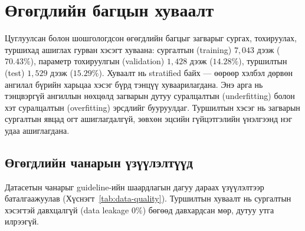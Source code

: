 \section{Өгөгдлийн багцын хуваалт}

Цуглуулсан болон шошгологдсон өгөгдлийн багцыг загварыг сургах, тохируулах, туршихад
ашиглах гурван хэсэгт хуваана: сургалтын (training) $7{,}043$ дээж ($70.43\%$),
параметр тохируулгын (validation) $1{,}428$ дээж ($14.28\%$), туршилтын (test)
$1{,}529$ дээж ($15.29\%$). Хуваалт нь stratified байх ---
өөрөөр хэлбэл дөрвөн ангилал бүрийн харьцаа хэсэг бүрд тэнцүү хуваарилагдана.
Энэ арга нь тэнцвэргүй ангиллын нөхцөлд загварын дутуу суралцалтын
(underfitting) болон хэт суралцалтын (overfitting) эрсдлийг бууруулдаг.
Туршилтын хэсэг нь загварын сургалтын явцад огт ашиглагдалгүй, зөвхөн эцсийн
гүйцэтгэлийн үнэлгээнд нэг удаа ашиглагдана.

\begin{table}[H]
\centering
\caption{Өгөгдлийн багцын ангилал бүрийн жишээний тоо (10,000 дээж)}
\label{tab:data-stats}
\end{table}

\subsection{Өгөгдлийн чанарын үзүүлэлтүүд}

Датасетын чанарыг guideline-ийн шаардлагын дагуу дараах үзүүлэлтээр
баталгаажуулав (Хүснэгт~\ref{tab:data-quality}). Туршилтын хуваалт нь
сургалтын хэсэгтэй давхцалгүй (data leakage $0\%$) бөгөөд давхардсан мөр,
дутуу утга илрээгүй.

